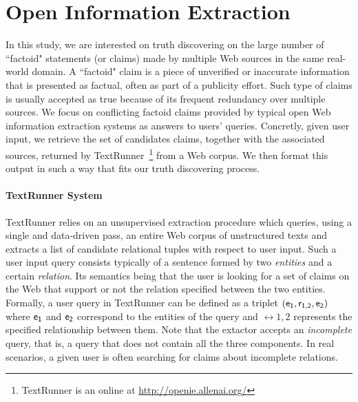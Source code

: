 \section{Open Information Extraction}

In this study, we are interested on truth discovering on the large number of ``factoid" statements
(or claims) made by multiple Web sources in the same real-world domain. A ``factoid" claim is
a piece of unverified or inaccurate information that is presented as factual, often
as part of a publicity effort. Such type of claims  is usually accepted as true  because of its
frequent redundancy over multiple sources. We focus on conflicting factoid claims provided by typical 
open Web information extraction systems as answers to users' queries. Concretly, given user input, 
we retrieve the set of candidates claims, together with the associated sources, returned by TextRunner~\footnote{TextRunner is an online
at \href{http://openie.allenai.org/}{http://openie.allenai.org/}}
from a Web corpus. We then format this output in such a way that fits our truth discovering process.



\paragraph*{TextRunner System}
TextRunner relies on an unsupervised extraction procedure which queries, using a single and data-driven 
pass, an entire Web corpus of unstructured texts and extracts a list of candidate relational tuples with 
respect to user input. Such a user input query consists typically of a sentence formed by
two \emph{entities} and a certain \emph{relation}. Its semantics being that the user is looking for a set 
of claims on the Web that support or not the relation specified between the two entities. Formally, a user
query in TextRunner can be defined as a triplet $(\mathsf{e_{1}}, \mathsf{r_{1,2}}, \mathsf{e_{2}})$ where $\mathsf{e_{1}}$ and $\mathsf{e_{2}}$ correspond 
to the entities of the query and $\rel{1,2}$ represents the specified relationship between them. Note that the 
extactor accepts an \emph{incomplete} query, that is, a query that does not contain all the three components. In 
real scenarios, a given user is often searching for claims about incomplete relations. 
 
